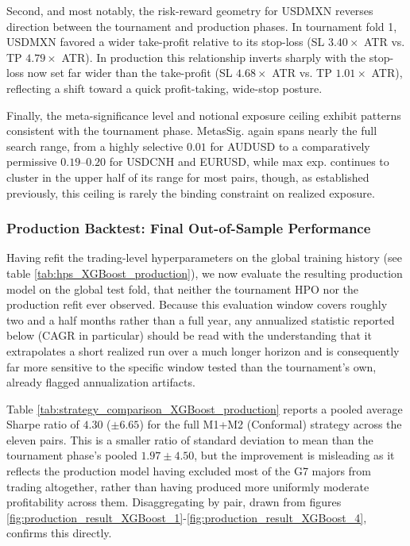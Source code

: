\documentclass[12pt, a4paper]{article}
\begin{document}
\medskip

Second, and most notably, the risk-reward geometry for USDMXN reverses direction between the tournament and production phases. In tournament fold 1, USDMXN favored a wider 
take-profit relative to its stop-loss (SL $3.40\times$ ATR vs. TP $4.79\times$ ATR). In production this relationship inverts sharply with the stop-loss now set far wider than 
the take-profit (SL $4.68\times$ ATR vs. TP $1.01\times$ ATR), reflecting a shift toward a quick profit-taking, wide-stop posture.

\medskip

Finally, the meta-significance level and notional exposure ceiling exhibit patterns consistent with the tournament phase. MetasSig. again spans nearly the full search range, from 
a highly selective $0.01$ for AUDUSD to a comparatively permissive $0.19$--$0.20$ for USDCNH and EURUSD, while max exp. continues to cluster in the upper half of its range for 
most pairs, though, as established previously, this ceiling is rarely the binding constraint on realized exposure.


\subsubsection{Production Backtest: Final Out-of-Sample Performance}\label{sec:production_performance}

Having refit the trading-level hyperparameters on the global training history (see table \ref{tab:hps_XGBoost_production}), we now evaluate the resulting production model on 
the global test fold, that neither the tournament HPO nor the production refit ever observed. 
Because this evaluation window covers roughly two and a half months rather than a full year, any annualized statistic reported below (CAGR in particular) should be read with the 
understanding that it extrapolates a short realized run over a much longer horizon and is consequently far more sensitive to the specific window tested than the tournament's own, 
already flagged annualization artifacts.



Table \ref{tab:strategy_comparison_XGBoost_production} reports a pooled average Sharpe ratio of $4.30$ ($\pm 6.65$) for the full M1+M2 (Conformal) strategy across the eleven pairs. 
This is a smaller ratio of standard deviation to mean than the tournament phase's pooled $1.97 \pm 4.50$, but the improvement is misleading as it reflects the production model 
having excluded most of the G7 majors from trading altogether, rather than having produced more uniformly moderate profitability across them. Disaggregating by pair, drawn from 
figures \ref{fig:production_result_XGBoost_1}-\ref{fig:production_result_XGBoost_4}, confirms this directly.
\end{document}
